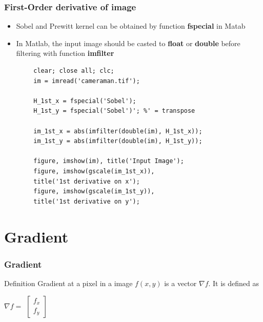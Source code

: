 \documentclass[english,11pt,table,handout]{beamer}
\begin{document}
\begin{frame}[fragile]
	
	\frametitle{First-Order derivative of image}
	\begin{itemize}
		\item Sobel and Prewitt kernel can be obtained by function \alert{\textbf{fspecial}} in Matab
		\item In Matlab, the input image should be casted to \alert{\textbf{float}} or \alert{\textbf{double}} before filtering with function \alert{\textbf{imfilter}}
	\end{itemize}
	\begin{example}
		\lstset{language=Matlab}
		\begin{lstlisting}
		clear; close all; clc;
		im = imread('cameraman.tif');
		
		H_1st_x = fspecial('Sobel');
		H_1st_y = fspecial('Sobel')'; %' = transpose
		
		im_1st_x = abs(imfilter(double(im), H_1st_x));
		im_1st_y = abs(imfilter(double(im), H_1st_y));
		
		figure, imshow(im), title('Input Image');
		figure, imshow(gscale(im_1st_x)),
		title('1st derivative on x');
		figure, imshow(gscale(im_1st_y)),
		title('1st derivative on y');
		\end{lstlisting}
	\end{example}
	
\end{frame}

\section{Gradient}
\frame
{
	\frametitle{Gradient}
	
	\begin{alertblock}{Definition}
	Gradient at a pixel in a image $f(x,y)$ is a vector $\nabla f$. It is defined as
	
	\centering
	
	$\nabla f = $ 
	$\left[ \begin{array}{r} 
		f_x \\
		f_y
	\end{array}\right]$
	
	\end{alertblock}
	

}
\end{document}
